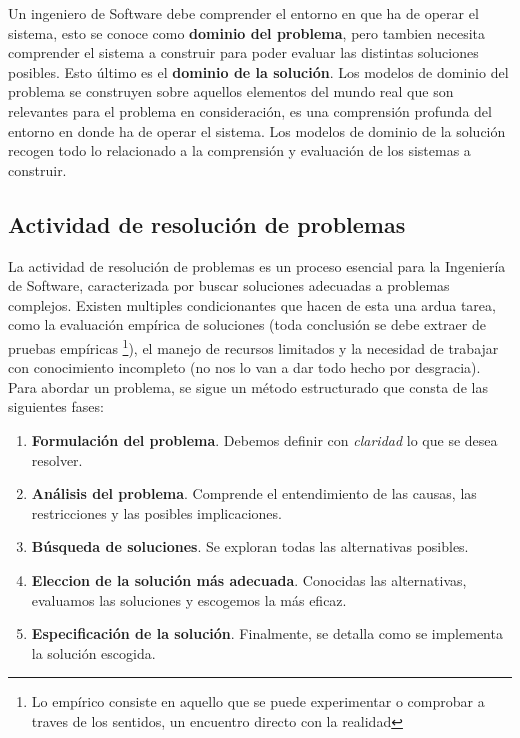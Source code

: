 Un ingeniero de Software debe comprender el entorno en que ha de operar el sistema, esto se conoce como 
\textbf{dominio del problema}, pero tambien necesita comprender el sistema a construir para poder evaluar las 
distintas soluciones posibles. Esto último es el \textbf{dominio de la solución}. Los modelos de dominio del
problema se construyen sobre aquellos elementos del mundo real que son relevantes para el problema en 
consideración, es una comprensión profunda del entorno en donde ha de operar el sistema. Los modelos de dominio
de la solución recogen todo lo relacionado a la comprensión y evaluación de los sistemas a construir.

\subsection{Actividad de resolución de problemas}

La actividad de resolución de problemas es un proceso esencial para la Ingeniería de Software, caracterizada por
buscar soluciones adecuadas a problemas complejos. Existen multiples condicionantes que hacen de esta una ardua
tarea, como la evaluación empírica de soluciones (toda conclusión se debe extraer de pruebas empíricas
\footnote{Lo empírico consiste en aquello que se puede experimentar o comprobar a traves de los sentidos, 
un encuentro directo con la realidad}), el manejo de recursos limitados y la necesidad de trabajar con 
conocimiento incompleto (no nos lo van a dar todo hecho por desgracia). Para abordar un problema, se sigue un 
método estructurado que consta de las siguientes fases:

\begin{enumerate}
    \item \textbf{Formulación del problema}. Debemos definir con \textit{claridad} lo que se desea resolver.
    \item \textbf{Análisis del problema}. Comprende el entendimiento de las causas, las restricciones y las
    posibles implicaciones.
    \item \textbf{Búsqueda de soluciones}. Se exploran todas las alternativas posibles.
    \item \textbf{Eleccion de la solución más adecuada}. Conocidas las alternativas, evaluamos las soluciones y
    escogemos la más eficaz.
    \item \textbf{Especificación de la solución}. Finalmente, se detalla como se implementa la solución escogida.
\end{enumerate}

